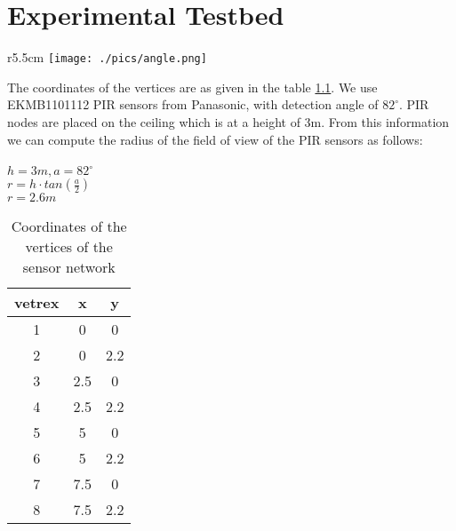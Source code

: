 \chapter{Experimental Testbed}
\label{app:A}

\begin{wrapfigure}{r}{5.5cm}
\texttt{[image: ./pics/angle.png]}
\label{fig:height}
\end{wrapfigure}
The coordinates of the vertices are as given in the table \ref{tab:htc34xy}. We use EKMB1101112 PIR sensors from Panasonic, with detection angle of $82^\circ$.
PIR nodes are placed on the ceiling which is at a height of 3m. From this information we can compute the radius of the field of view of the PIR sensors as follows:\\\\
$h=3m, a = 82^{\circ}$\\
$r=h\cdot tan(\frac{a}{2})$\\
$r=2.6m$\\






\begin{table}[]
\centering
\caption{Coordinates of the vertices of the sensor network}
\label{tab:htc34xy}
\begin{tabular}{|c|c|c|}
\hline
vetrex & x   & y   \\ \hline
1      & 0   & 0   \\ \hline
2      & 0   & 2.2 \\ \hline
3      & 2.5 & 0   \\ \hline
4      & 2.5 & 2.2 \\ \hline
5      & 5   & 0   \\ \hline
6      & 5   & 2.2 \\ \hline
7      & 7.5 & 0   \\ \hline
8      & 7.5 & 2.2 \\ \hline
\end{tabular}
\end{table}

